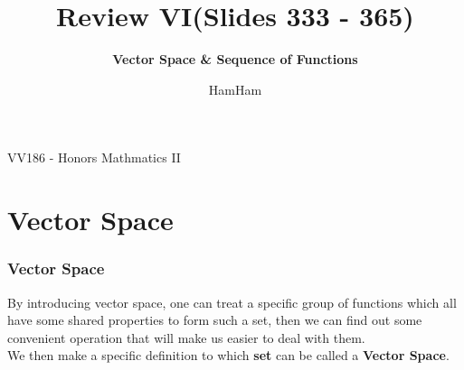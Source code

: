 \documentclass{beamer}
\title{\sffamily Review VI(Slides 333 - 365)}
\subtitle{\textbf{Vector Space \& Sequence of Functions}\\ }
\institute[UM-SJTU JI]{University of Michigan-Shanghai Jiao Tong University Joint Institute}
\author{HamHam}
\newcommand{\myfont}{\rmfamily\normalsize\upshape\mdseries}
\begin{document}
\begin{titlepage}
    \begin{center}
        VV186 - Honors Mathmatics II
    \end{center}
\end{titlepage}
\myfont


\section{Vector Space}
\begin{frame}
    \frametitle{Vector Space}

    \hspace{1em}By introducing vector space, one can treat a specific group of functions which all have some shared properties to form such a set, then 
we can find out some convenient operation that will make us easier to deal with them.\\
\vspace{1em}
\hspace{1em}
We then make a specific definition to which \textbf{set} can be called a \textbf{Vector Space}.
    
\end{frame}
\end{document}
